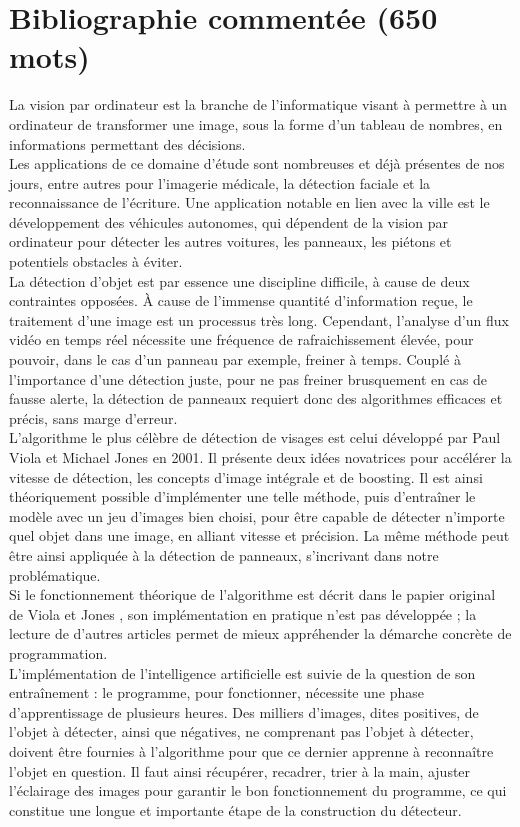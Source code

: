 \documentclass[12pt,a4paper]{article}
\begin{document}
\section{Bibliographie commentée (650 mots)}
La vision par ordinateur est la branche de l’informatique visant à permettre à un ordinateur de transformer une image, sous la forme d’un tableau de nombres, en informations permettant des décisions. \cite{ibm} \\
Les applications de ce domaine d’étude sont nombreuses et déjà présentes de nos jours, entre autres pour l’imagerie médicale, la détection faciale et la reconnaissance de l’écriture. \cite{ibm}\cite{szeliski} Une application notable en lien avec la ville est le développement des véhicules autonomes, qui dépendent de la vision par ordinateur pour détecter les autres voitures, les panneaux, les piétons et potentiels obstacles à éviter. \cite{ibm} \\
La détection d’objet est par essence une discipline difficile, à cause de deux contraintes opposées. À cause de l’immense quantité d’information reçue, le traitement d’une image est un processus très long. Cependant, l’analyse d’un flux vidéo en temps réel nécessite une fréquence de rafraichissement élevée, pour pouvoir, dans le cas d’un panneau par exemple, freiner à temps. Couplé à l’importance d’une détection juste, pour ne pas freiner brusquement en cas de fausse alerte, la détection de panneaux requiert donc des algorithmes efficaces et précis, sans marge d’erreur. \\
L’algorithme le plus célèbre \cite{szeliski} de détection de visages est celui développé par Paul Viola et Michael Jones \cite{viola-jones} en 2001. Il présente deux idées novatrices pour accélérer la vitesse de détection, les concepts d’image intégrale et de boosting\cite{computerphile}. Il est ainsi théoriquement possible d’implémenter une telle méthode, puis d’entraîner le modèle avec un jeu d’images bien choisi, pour être capable de détecter n’importe quel objet dans une image, en alliant vitesse et précision. La même méthode peut être ainsi appliquée à la détection de panneaux, s'incrivant dans notre problématique. \\
Si le fonctionnement théorique de l’algorithme est décrit dans le papier original de Viola et Jones \cite{viola-jones}, son implémentation en pratique n’est pas développée ; la lecture de d’autres articles \cite{wang}\cite{parande} permet de mieux appréhender la démarche concrète de programmation. \\
L’implémentation de l'intelligence artificielle est suivie de la question de son entraînement : le programme, pour fonctionner, nécessite une phase d’apprentissage de plusieurs heures. Des milliers d’images, dites positives, de l’objet à détecter, ainsi que négatives, ne comprenant pas l’objet à détecter, doivent être fournies à l’algorithme pour que ce dernier apprenne à reconnaître l’objet en question. Il faut ainsi récupérer, recadrer, trier à la main, ajuster l’éclairage des images \cite{viola-jones}\cite{wang} pour garantir le bon fonctionnement du programme, ce qui constitue une longue et importante étape de la construction du détecteur. \\
\end{document}
